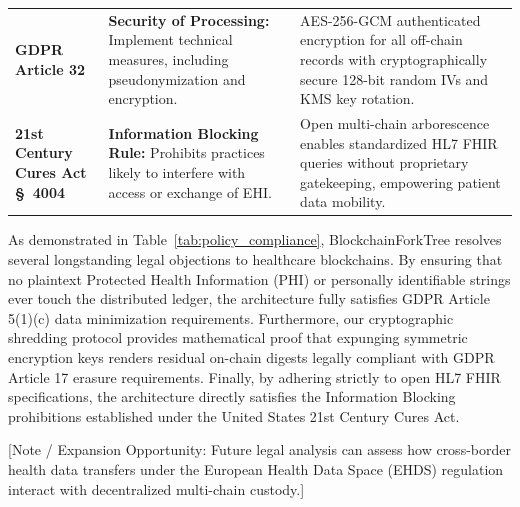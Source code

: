 \begin{table}[t]
\begin{tabularx}{\textwidth}{p{3.5cm}p{4.2cm}X}
\addlinespace
\textbf{GDPR Article 32} & \textbf{Security of Processing:} Implement technical measures, including pseudonymization and encryption. & AES-256-GCM authenticated encryption for all off-chain records with cryptographically secure 128-bit random IVs and KMS key rotation. \\
\addlinespace
\textbf{21st Century Cures Act \S~4004} & \textbf{Information Blocking Rule:} Prohibits practices likely to interfere with access or exchange of EHI. & Open multi-chain arborescence enables standardized HL7 FHIR queries without proprietary gatekeeping, empowering patient data mobility. \\
\bottomrule
\end{tabularx}
\end{table}

As demonstrated in Table~\ref{tab:policy_compliance}, BlockchainForkTree resolves several longstanding legal objections to healthcare blockchains. By ensuring that no plaintext Protected Health Information (PHI) or personally identifiable strings ever touch the distributed ledger, the architecture fully satisfies GDPR Article 5(1)(c) data minimization requirements. Furthermore, our cryptographic shredding protocol provides mathematical proof that expunging symmetric encryption keys renders residual on-chain digests legally compliant with GDPR Article 17 erasure requirements. Finally, by adhering strictly to open HL7 FHIR specifications, the architecture directly satisfies the Information Blocking prohibitions established under the United States 21st Century Cures Act.

[Note / Expansion Opportunity: Future legal analysis can assess how cross-border health data transfers under the European Health Data Space (EHDS) regulation interact with decentralized multi-chain custody.]

